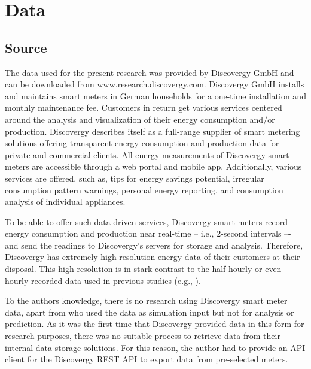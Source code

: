 
\section{Data}\label{Sec:Data}




\subsection{Source}\label{Sec:Data;Subsec:Source}

The data used for the present research was provided by Discovergy GmbH and can be downloaded from www.research.discovergy.com. Discovergy GmbH installs and maintains smart meters in German households for a one-time installation and monthly maintenance fee. Customers in return get various services centered around the analysis and visualization of their energy consumption and/or production. Discovergy describes itself as a full-range supplier of smart metering solutions offering transparent energy consumption and production data for private and commercial clients. All energy measurements of Discovergy smart meters are accessible through a web portal and mobile app. Additionally, various services are offered, such as, tips for energy savings potential, irregular consumption pattern warnings, personal energy reporting, and consumption analysis of individual appliances.

To be able to offer such data-driven services, Discovergy smart meters record energy consumption and production near real-time -- i.e., 2-second intervals –- and send the readings to Discovergy's servers for storage and analysis. Therefore, Discovergy has extremely high resolution energy data of their customers at their disposal. This high resolution is in stark contrast to the half-hourly or even hourly recorded data used in previous studies (e.g., \cite{Arora:2016,Auder:2018,Shi:2017,Gerossier:2017}).

To the authors knowledge, there is no research using Discovergy smart meter data, apart from \cite{Teixeira:2017} who used the data as simulation input but not for analysis or prediction. As it was the first time that Discovergy provided data in this form for research purposes, there was no suitable process to retrieve data from their internal data storage solutions. For this reason, the author had to provide an API client for the Discovergy REST API to export data from pre-selected meters.


